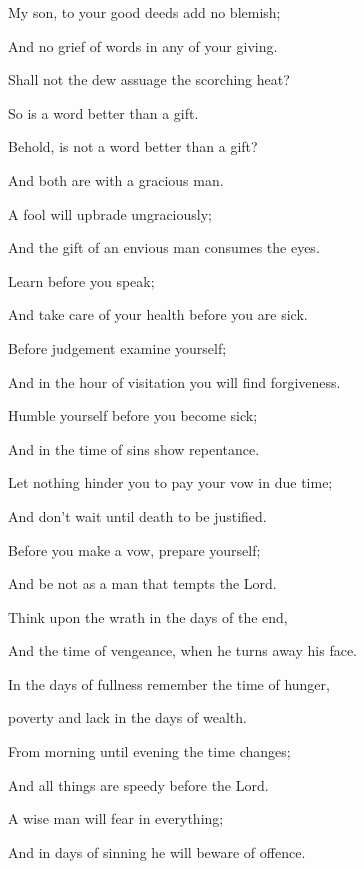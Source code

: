 {\par }{\BB \par }{\Q {}My son, to your good deeds add no blemish;
\par }{\Q And no grief of words in any of your giving.
\par }{\Q {}Shall not the dew assuage the scorching heat?
\par }{\Q So is a word better than a gift.
\par }{\Q {}Behold, is not a word better than a gift?
\par }{\Q And both are with a gracious man.
\par }{\Q {}A fool will upbrade ungraciously;
\par }{\Q And the gift of an envious man consumes the eyes.
\par }{\BB \par }{\Q {}Learn before you speak;
\par }{\Q And take care of your health before you are sick.
\par }{\Q {}Before judgement examine yourself;
\par }{\Q And in the hour of visitation you will find forgiveness.
\par }{\Q {}Humble yourself before you become sick;
\par }{\Q And in the time of sins show repentance.
\par }{\Q {}Let nothing hinder you to pay your vow in due time;
\par }{\Q And don’t wait until death to be justified.
\par }{\Q {}Before you make a vow, prepare yourself;
\par }{\Q And be not as a man that tempts the Lord.
\par }{\Q {}Think upon the wrath
{} in the days of the end,
\par }{\Q And the time of vengeance, when he turns away his face.
\par }{\Q {}In the days of fullness remember the time of hunger,
\par }{ poverty and lack in the days of wealth.
\par }{\Q {}From morning until evening the time changes;
\par }{\Q And all things are speedy before the Lord.
\par }{\Q {}A wise man will fear in everything;
\par }{\Q And in days of sinning he will beware of offence.
}
